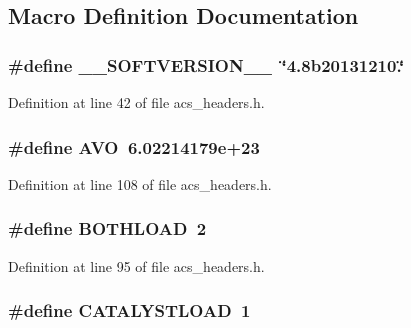 \subsection{Macro Definition Documentation}
\hypertarget{a00072_aab38659c2fe462437b89a1e85e619dc7}{
\subsubsection[{\-\_\-\-\_\-\-S\-O\-F\-T\-V\-E\-R\-S\-I\-O\-N\-\_\-\-\_\-}]{\setlength{\rightskip}{0pt plus 5cm}\#define \-\_\-\-\_\-\-S\-O\-F\-T\-V\-E\-R\-S\-I\-O\-N\-\_\-\-\_\-~\char`\"{}4.\-8b20131210.\char`\"{}}}\label{a00072_aab38659c2fe462437b89a1e85e619dc7}


Definition at line 42 of file acs\-\_\-headers.\-h.

\hypertarget{a00072_a174754c04acfba9e1f66ba249e68643a}{
\subsubsection[{A\-V\-O}]{\setlength{\rightskip}{0pt plus 5cm}\#define A\-V\-O~6.\-02214179e+23}}\label{a00072_a174754c04acfba9e1f66ba249e68643a}


Definition at line 108 of file acs\-\_\-headers.\-h.

\hypertarget{a00072_afb6d1105a81463fbadceff0217332f68}{
\subsubsection[{B\-O\-T\-H\-L\-O\-A\-D}]{\setlength{\rightskip}{0pt plus 5cm}\#define B\-O\-T\-H\-L\-O\-A\-D~2}}\label{a00072_afb6d1105a81463fbadceff0217332f68}


Definition at line 95 of file acs\-\_\-headers.\-h.

\hypertarget{a00072_a7e521c899f69e37df3501fd0e652c517}{
\subsubsection[{C\-A\-T\-A\-L\-Y\-S\-T\-L\-O\-A\-D}]{\setlength{\rightskip}{0pt plus 5cm}\#define C\-A\-T\-A\-L\-Y\-S\-T\-L\-O\-A\-D~1}}\label{a00072_a7e521c899f69e37df3501fd0e652c517}


